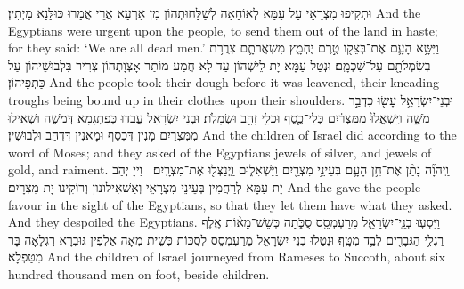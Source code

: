 {וּתְקִיפוּ מִצְרָאֵי עַל עַמָּא לְאוֹחָאָה לְשַׁלָּחוּתְהוֹן מִן אַרְעָא אֲרֵי אֲמַרוּ כּוּלַּנָא מָיְתִין׃}
{And the Egyptians were urgent upon the people, to send them out of the land in haste; for they said: ‘We are all dead men.’}{}
{וַיִּשָּׂ֥א הָעָ֛ם אֶת־בְּצֵק֖וֹ טֶ֣רֶם יֶחְמָ֑ץ מִשְׁאֲרֹתָ֛ם צְרֻרֹ֥ת בְּשִׂמְלֹתָ֖ם עַל־שִׁכְמָֽם׃
}
{וּנְטַל עַמָּא יָת לֵישְׁהוֹן עַד לָא חֲמַע מוֹתַר אָצְוָתְהוֹן צְרִיר בִּלְבוּשֵׁיהוֹן עַל כַּתְפֵיהוֹן׃}
{And the people took their dough before it was leavened, their kneading-troughs being bound up in their clothes upon their shoulders.}{}
{וּבְנֵי־יִשְׂרָאֵ֥ל עָשׂ֖וּ כִּדְבַ֣ר מֹשֶׁ֑ה וַֽיִּשְׁאֲלוּ֙ מִמִּצְרַ֔יִם כְּלֵי־כֶ֛סֶף וּכְלֵ֥י זָהָ֖ב וּשְׂמָלֹֽת׃
}
{וּבְנֵי יִשְׂרָאֵל עֲבַדוּ כְּפִתְגָמָא דְּמֹשֶׁה וּשְׁאִילוּ מִמִּצְרַיִם מָנִין דִּכְסַף וּמָאנִין דִּדְהַב וּלְבוּשִׁין׃}
{And the children of Israel did according to the word of Moses; and they asked of the Egyptians jewels of silver, and jewels of gold, and raiment.}{}
{וַֽיהֹוָ֞ה נָתַ֨ן אֶת־חֵ֥ן הָעָ֛ם בְּעֵינֵ֥י מִצְרַ֖יִם וַיַּשְׁאִל֑וּם וַֽיְנַצְּל֖וּ אֶת־מִצְרָֽיִם׃ \petucha 
{}}
{וַייָ יְהַב יָת עַמָּא לְרַחֲמִין בְּעֵינֵי מִצְרָאֵי וְאַשְׁאִילוּנוּן וְרוֹקִינוּ יָת מִצְרָיִם׃}
{And the \lord\space gave the people favour in the sight of the Egyptians, so that they let them have what they asked. And they despoiled the Egyptians.}{}
{וַיִּסְע֧וּ בְנֵֽי־יִשְׂרָאֵ֛ל מֵרַעְמְסֵ֖ס סֻכֹּ֑תָה כְּשֵׁשׁ־מֵא֨וֹת אֶ֧לֶף רַגְלִ֛י הַגְּבָרִ֖ים לְבַ֥ד מִטָּֽף׃
}
{וּנְטַלוּ בְנֵי יִשְׂרָאֵל מֵרַעְמְסֵס לְסֻכּוֹת כְּשֵׁית מְאָה אַלְפִין גּוּבְרָא רִגְלָאָה בָּר מִטַּפְלָא׃}
{And the children of Israel journeyed from Rameses to Succoth, about six hundred thousand men on foot, beside children.}{}
